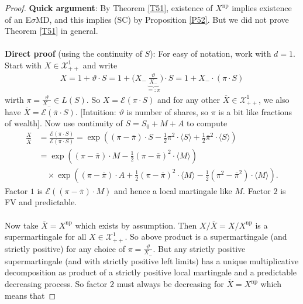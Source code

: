 \documentclass[12pt,a4paper, twoside]{article}
\theoremstyle{definition}
\begin{document}
\begin{proof}
\textbf{Quick argument}: By Theorem \ref{T51}, existence of $X^\text{np}$ implies existence of an E$\sigma$MD, and this implies (SC) by Proposition \ref{P52}. But we did not prove Theorem \ref{T51} in general. 
\\\\
\textbf{Direct proof} (using the continuity of $S$): For easy of notation, work with $d=1$. Start with $X \in \mathcal{X}_{++}^1$ and write 
\begin{align*}
X = 1 + \vartheta \cdot S = 1+ \Big( X_- \underbrace{\frac{\vartheta}{X_-}}_{=: \pi} \Big)  \cdot S = 1 + X_- \cdot (\pi \cdot S)
\end{align*}
wirth $\pi = \frac{\vartheta}{X_-} \in L(S)$. So $X = \mathcal{E}( \pi \cdot S)$ and for any other $\overline{X} \in \mathcal{X}_{++}^1$, we also have $\overline{X}= \mathcal{E}( \overline{\pi} \cdot S)$. [Intuition: $\vartheta$ is number of shares, so $\pi$ is a bit like fractions of wealth]. 
\newpage
Now use continuity of $S=S_0 + M + A$ to compute \begin{align*}
\frac{X}{\overline{X}}& = \frac{\mathcal{E}( \pi \cdot S)}{\mathcal{E}( \overline{\pi}\cdot S)} = \exp \left( ( \pi - \overline{\pi}) \cdot S- \frac{1}{2}\pi^2 \cdot \langle S \rangle + \frac{1}{2} \overline{\pi}^2 \cdot \langle S \rangle \right) \\
& = \exp \left(  ( \pi- \overline{\pi}) \cdot M - \frac{1}{2}( \pi- \overline{\pi})^2 \cdot \langle M \rangle \right) \\ & \quad \times \exp \left( ( \pi- \overline{\pi}) \cdot A + \frac{1}{2}( \pi- \overline{\pi})^2 \cdot \langle M \rangle - \frac{1}{2}( \pi^2- \overline{\pi}^2) \cdot \langle M \rangle \right).
\end{align*}
Factor $1$ is $\mathcal{E}(( \pi - \overline{\pi}) \cdot M )$ and hence a local martingale like $M$. Factor $2$ is FV and predictable. \\
\\
Now take $\overline{X}= X^\text{np}$ which exists by assumption. Then $X/\overline{X}= X/X^\text{np}$ is a supermartingale for all $X \in \mathcal{X}_{++}^1$. So above product is a supermartingale (and strictly positive) for any choice of $\pi = \frac{\vartheta}{X_-}$. But any strictly positive supermartingale (and with strictly positive left limits) has a unique multiplicative decomposition as product of a strictly positive local martingale and a predictable decreasing process. So factor $2$ must always be decreasing for $\overline{X}= X^\text{np}$ which means that

\end{proof}
\end{document}
